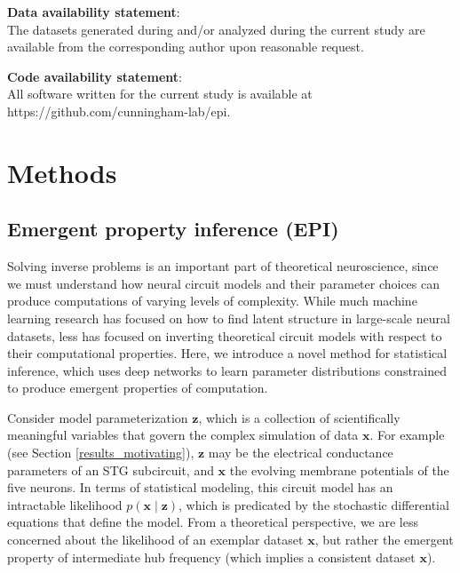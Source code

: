 \documentclass[11pt]{article}
\makeatletter
\newcommand\startsupplement{%
    \makeatletter 
       \setcounter{table}{0}
       \renewcommand{\thetable}{S\arabic\c@table}
       \setcounter{figure}{0}
       \renewcommand{\thefigure}{S\arabic{figure}}
    \makeatother}
\makeatother
\begin{document}
\textbf{Data availability statement}: \\
The datasets generated during and/or analyzed during the current study are available from the corresponding author upon reasonable request.

\textbf{Code availability statement}: \\
All software written for the current study is available at https://github.com/cunningham-lab/epi.




\newpage 
\startsupplement
\section{Methods}

\subsection{Emergent property inference (EPI)}\label{methods_EPI}
Solving inverse problems is an important part of theoretical neuroscience, since we must understand how neural circuit models and their parameter choices can produce computations of varying levels of complexity.
While much machine learning research has focused on how to find latent structure in large-scale neural datasets, less has focused on inverting theoretical circuit models with respect to their computational properties.
Here, we introduce a novel method for statistical inference, which uses deep networks to learn parameter distributions constrained to produce emergent properties of computation.
 
Consider model parameterization $\mathbf{z}$, which is a collection of scientifically meaningful variables that govern the complex simulation of data $\mathbf{x}$.
For example (see Section \ref{results_motivating}), $\mathbf{z}$ may be the electrical conductance parameters of an STG subcircuit, and $\mathbf{x}$ the evolving membrane potentials of the five neurons.
In terms of statistical modeling, this circuit model has an intractable likelihood $p(\mathbf{x} \mid \mathbf{z})$, which is predicated by the stochastic differential equations that define the model.
From a theoretical perspective, we are less concerned about the likelihood of an exemplar dataset $\mathbf{x}$, but rather the emergent property of intermediate hub frequency (which implies a consistent dataset $\mathbf{x}$).
\end{document}

